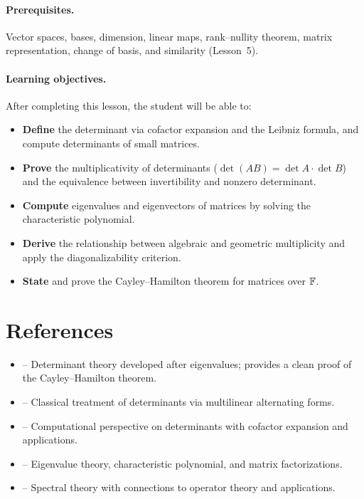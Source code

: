 \documentclass[11pt,a4paper]{article}
\begin{document}
\paragraph{Prerequisites.}
Vector spaces, bases, dimension, linear maps, rank--nullity theorem,
matrix representation, change of basis, and similarity (Lesson~5).

\paragraph{Learning objectives.}
After completing this lesson, the student will be able to:
\begin{itemize}[nosep]
  \item \textbf{Define} the determinant via cofactor expansion and the
        Leibniz formula, and compute determinants of small matrices.
  \item \textbf{Prove} the multiplicativity of determinants
        ($\det(AB) = \det A \cdot \det B$) and the equivalence between
        invertibility and nonzero determinant.
  \item \textbf{Compute} eigenvalues and eigenvectors of matrices by
        solving the characteristic polynomial.
  \item \textbf{Derive} the relationship between algebraic and geometric
        multiplicity and apply the diagonalizability criterion.
  \item \textbf{State} and prove the Cayley--Hamilton theorem for
        matrices over $\mathbb{F}$.
\end{itemize}

\section{References}
\label{sec:references}

\begin{itemize}
  \item \citet[Chapter 10]{axler2015} -- Determinant theory developed after
        eigenvalues; provides a clean proof of the Cayley--Hamilton theorem.
  \item \citet[Chapter 5]{hoffman1971} -- Classical treatment of
        determinants via multilinear alternating forms.
  \item \citet[Chapter 5]{strang2016} -- Computational perspective on
        determinants with cofactor expansion and applications.
  \item \citet[Chapter 1]{horn2013} -- Eigenvalue theory, characteristic
        polynomial, and matrix factorizations.
  \item \citet[Chapter 6]{lax2007} -- Spectral theory with connections
        to operator theory and applications.
\end{itemize}
\end{document}
